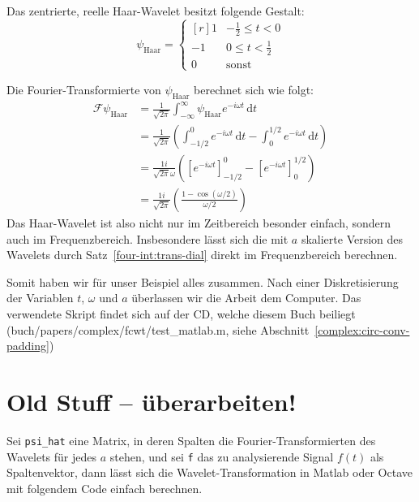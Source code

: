 \begin{definition}
	\label{complex:def-haar-wavelet}
	Das zentrierte, reelle Haar-Wavelet besitzt folgende Gestalt:
	\[
	\psi_{\text{Haar}} = \left\lbrace\begin{matrix*}[r]
	1 & -\frac{1}{2} \le t < 0  \\
	-1 & 0 \le t < \frac{1}{2} \\
	0 & \text{sonst}
	\end{matrix*} \right.\label{complex:def-haar}
	\]
\end{definition}
Die Fourier-Transformierte von $\psi_{\text{Haar}}$ berechnet sich wie folgt:
\begin{align}
	\mathcal F \psi_\text{Haar}  
	&= \frac{1}{\sqrt{2\pi}}\int_{-\infty}^{\infty} \psi_\text{Haar} e^{-i\omega t} \,\mathrm{d}t\nonumber\\
	&= \frac{1}{\sqrt{2\pi}}\left( \int_{-1/2}^{0} e^{-i\omega t} \,\mathrm{d}t - \int_{0}^{1/2} e^{-i\omega t}\,\mathrm{d}t \right) \nonumber\\
	&= \frac{1i}{\sqrt{2\pi}\omega}\left( \left[ e^{-i\omega t}\right]_{-1/2}^0  - \left[ e^{-i\omega t}\right]_{0}^{1/2} \right)\nonumber\\
	&= \frac{1i}{\sqrt{2\pi}}\left( \frac{1-\cos(\omega/2)}{\omega/2}\right)\label{complex:f-psi-haar}
\end{align}
Das Haar-Wavelet ist also nicht nur im Zeitbereich besonder einfach, sondern auch im Frequenzbereich.
Insbesondere lässt sich die mit $a$ skalierte Version des Wavelets durch Satz~\ref{four-int:trans-dial} direkt im Frequenzbereich berechnen.

Somit haben wir für unser Beispiel alles zusammen.
Nach einer Diskretisierung der Variablen $t$, $\omega$ und $a$ überlassen wir die Arbeit dem Computer.
Das verwendete Skript findet sich auf der CD, welche diesem Buch beiliegt (buch/papers/complex/fcwt/test\_matlab.m, siehe Abschnitt~\ref{complex:circ-conv-padding})

\section{Old Stuff -- überarbeiten!}

Sei \verb|psi_hat| eine Matrix, in deren Spalten die Fourier-Transformierten des Wavelets für jedes $a$ stehen,
und sei \verb|f| das zu analysierende Signal $f(t)$ als Spaltenvektor,
dann lässt sich die Wavelet-Transformation in Matlab oder Octave mit folgendem Code einfach berechnen.

